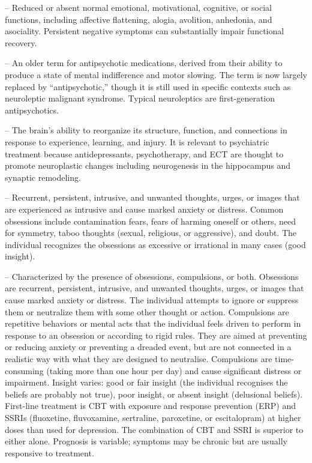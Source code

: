 -- Reduced or absent normal emotional, motivational, cognitive, or social functions, including affective flattening, alogia, avolition, anhedonia, and asociality. Persistent negative symptoms can substantially impair functional recovery.

-- An older term for antipsychotic medications, derived from their ability to produce a state of mental indifference and motor slowing. The term is now largely replaced by ``antipsychotic,'' though it is still used in specific contexts such as neuroleptic malignant syndrome. Typical neuroleptics are first-generation antipsychotics.

-- The brain's ability to reorganize its structure, function, and connections in response to experience, learning, and injury. It is relevant to psychiatric treatment because antidepressants, psychotherapy, and ECT are thought to promote neuroplastic changes including neurogenesis in the hippocampus and synaptic remodeling.

-- Recurrent, persistent, intrusive, and unwanted thoughts, urges, or images that are experienced as intrusive and cause marked anxiety or distress. Common obsessions include contamination fears, fears of harming oneself or others, need for symmetry, taboo thoughts (sexual, religious, or aggressive), and doubt. The individual recognizes the obsessions as excessive or irrational in many cases (good insight).

-- Characterized by the presence of obsessions, compulsions, or both. Obsessions are recurrent, persistent, intrusive, and unwanted thoughts, urges, or images that cause marked anxiety or distress. The individual attempts to ignore or suppress them or neutralize them with some other thought or action. Compulsions are repetitive behaviors or mental acts that the individual feels driven to perform in response to an obsession or according to rigid rules. They are aimed at preventing or reducing anxiety or preventing a dreaded event, but are not connected in a realistic way with what they are designed to neutralise. Compulsions are time-consuming (taking more than one hour per day) and cause significant distress or impairment. Insight varies: good or fair insight (the individual recognises the beliefs are probably not true), poor insight, or absent insight (delusional beliefs). First-line treatment is CBT with exposure and response prevention (ERP) and SSRIs (fluoxetine, fluvoxamine, sertraline, paroxetine, or escitalopram) at higher doses than used for depression. The combination of CBT and SSRI is superior to either alone. Prognosis is variable; symptoms may be chronic but are usually responsive to treatment.

